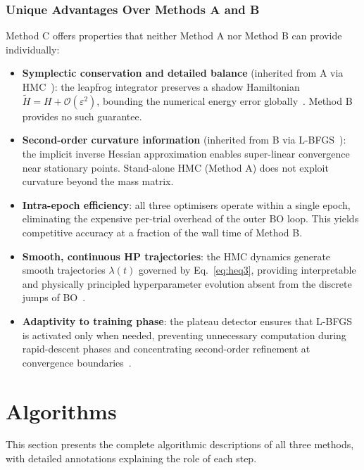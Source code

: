 \documentclass[12pt,a4paper]{article}
\begin{document}
\subsubsection{Unique Advantages Over Methods A and B}

Method C offers properties that neither Method A nor Method B can
provide individually:

\begin{itemize}[leftmargin=*]
\item \textbf{Symplectic conservation and detailed balance} (inherited
      from A via HMC~\cite{betancourt2017,leimkuhler2004}): the
      leapfrog integrator preserves a shadow Hamiltonian
      $\tilde{H} = H + \mathcal{O}(\varepsilon^2)$, bounding the
      numerical energy error globally~\cite{hairer2006}.  Method B
      provides no such guarantee.

\item \textbf{Second-order curvature information} (inherited from B via
      L-BFGS~\cite{liu1989lbfgs}): the implicit inverse Hessian
      approximation enables super-linear convergence near stationary
      points.  Stand-alone HMC (Method A) does not exploit curvature
      beyond the mass matrix.

\item \textbf{Intra-epoch efficiency}: all three optimisers operate
      within a single epoch, eliminating the expensive per-trial
      overhead of the outer BO loop.  This yields competitive
      accuracy at a fraction of the wall time of Method B.

\item \textbf{Smooth, continuous HP trajectories}: the HMC dynamics
      generate smooth trajectories $\lambda(t)$ governed by
      Eq.~\eqref{eq:heq3}, providing interpretable and physically
      principled hyperparameter evolution absent from the discrete
      jumps of BO~\cite{zhang2025}.

\item \textbf{Adaptivity to training phase}: the plateau detector
      ensures that L-BFGS is activated only when needed, preventing
      unnecessary computation during rapid-descent phases and
      concentrating second-order refinement at convergence
      boundaries~\cite{rathore2024,kiyani2025}.
\end{itemize}
\section{Algorithms}
This section presents the complete algorithmic descriptions of all
three methods, with detailed annotations explaining the role of each
step.
\end{document}
